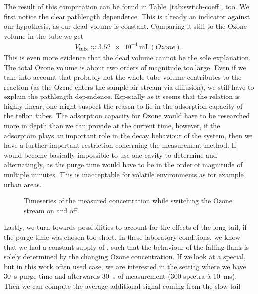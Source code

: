 The result of this computation can be found in
Table~\ref{tab:switch-coeff}, too. We first notice the clear
pathlength dependence. This is already an indicator against our
hypothesis, as our dead volume is constant. Comparing it still to the
Ozone volume in the tube we get
\begin{align*}
  V_{\text{tube}} \approx \SI{3.52e-4}{\milli\liter(Ozone)}.
\end{align*}
This is even more evidence that the dead volume cannot be the sole
explanation. The total Ozone volume is about two orders of magnitude
too large. Even if we take into account that probably not the whole
tube volume contributes to the reaction (as the Ozone enters the
sample air stream via diffusion), we still have to explain the
pathlength dependence. Especially as it seems that the relation is
highly linear, one might suspect the reason to lie in the adsorption
capacity of the teflon tubes. The adsorption capacity for Ozone would
have to be researched more in depth than we can provide at the current
time, however, if the adsorptoin plays an important role in the decay
behaviour of the system, then we have a further important restriction
concerning the measurement method. If would become basically
impossible to use one cavity to determine  and 
alternatingly, as the purge time would have to be in the order of
magnitude of multiple minutes. This is inacceptable for volatile
environments as for example urban areas.

\begin{figure}[htbp]
  \centering
  
  \caption{Timeseries of the measured  concentration while
    switching the Ozone stream on and off.}
  \label{fig:switch}
\end{figure}
Lastly, we turn towards possibilities to account for the effects of
the long tail, if the purge time was chosen too short. In these
laboratory conditions, we know that we had a constant supply of
, such that the behaviour of the falling flank is solely
determined by the changing Ozone concentration. If we look at a
special, but in this work often used case, we are interested in the
setting where we have \SI{30}{\second} purge time and afterwards
\SI{30}{\second} of measurement (300 spectra à
\SI{10}{\milli\second}). Then we can compute the average additional
 signal coming from the slow tail

